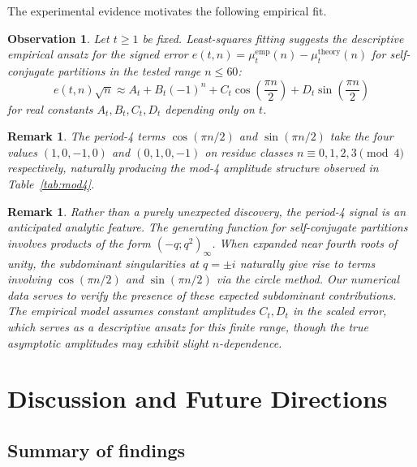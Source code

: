 \documentclass[11pt,reqno]{amsart}
\newtheorem{observation}[theorem]{Observation}
\newtheorem{remark}[theorem]{Remark}
\begin{document}
The experimental evidence motivates the following empirical fit.

\begin{observation}\label{obs:main}
Let $t \geq 1$ be fixed. Least-squares fitting suggests the descriptive empirical 
ansatz for the signed error $e(t,n) = \mu_t^{\mathrm{emp}}(n) - \mu_t^{\mathrm{theory}}(n)$ 
for self-conjugate partitions in the tested range $n \le 60$:
\[
e(t,n)\sqrt{n} \approx A_t + B_t(-1)^n 
+ C_t\cos\!\left(\frac{\pi n}{2}\right) 
+ D_t\sin\!\left(\frac{\pi n}{2}\right) 
\]
for real constants $A_t, B_t, C_t, D_t$ depending only on $t$. 
\end{observation}

\begin{remark}
The period-4 terms $\cos(\pi n/2)$ and $\sin(\pi n/2)$ 
take the four values $(1,0,-1,0)$ and $(0,1,0,-1)$ on 
residue classes $n \equiv 0,1,2,3 \pmod{4}$ respectively, 
naturally producing the mod-4 amplitude structure observed 
in Table~\ref{tab:mod4}.
\end{remark}

\begin{remark}
Rather than a purely unexpected discovery, the period-4 signal is an anticipated 
analytic feature. The generating function for self-conjugate partitions involves 
products of the form $(-q;q^2)_\infty$. When expanded near fourth roots 
of unity, the subdominant singularities at $q = \pm i$ naturally give rise 
to terms involving $\cos(\pi n/2)$ and $\sin(\pi n/2)$ via the circle method. 
Our numerical data serves to verify the presence of these expected subdominant 
contributions. The empirical model assumes constant amplitudes $C_t, D_t$ in the scaled error, 
which serves as a descriptive ansatz for this finite range, though the true 
asymptotic amplitudes may exhibit slight $n$-dependence.
\end{remark}

\section{Discussion and Future Directions}

\subsection{Summary of findings}
\end{document}
